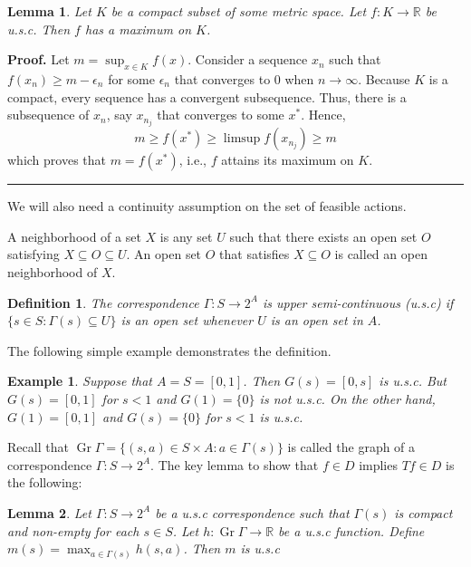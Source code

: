 \documentclass[letter,11pt]{article}
\newtheorem{definition}{Definition}[section]
\newtheorem{example}{Example}[section]
\newtheorem{lemma}{Lemma}[section]
\newenvironment {proof}[1][Proof]{\noindent \textbf {#1.} }{\ \rule {0.5em}{0.5em}}
\begin{document}
\begin{lemma} \label{Lemma:USC_MAX}
     Let $K$ be a compact subset of some metric space. Let $f:K \rightarrow \mathbb{R}$ be u.s.c. 
     Then $f$ has a maximum on $K$. 
\end{lemma}
\begin{proof}
     Let $m = \sup _{x \in K} f(x)$. Consider a sequence $x_{n}$ such that $f(x_{n}) \geq m - \epsilon_{n}$ for some $\epsilon_{n} $ that converges to $0$ when $n \rightarrow \infty$. Because $K$ is a compact, every sequence has a convergent subsequence. Thus, there is a subsequence of $x_{n}$, say $x_{n_{j}}$ that converges to some $x^{*}$. Hence, 
$$ m \geq f(x^{*}) \geq \limsup f(x_{n_{j}}) \geq m $$
which proves that $m = f(x^{*})$, i.e., $f$ attains its maximum on $K$. 
\end{proof}

We will also need a continuity assumption on the set of feasible actions. 

A neighborhood of a set $X$ is any set $U$ such that there exists an open set $O$ satisfying $X \subseteq O \subseteq U$. An open set $O$ that satisfies $X \subseteq O$ is called an open neighborhood of $X$. 

\begin{definition}
    The correspondence $\Gamma:S \rightarrow 2^{A}$ is upper semi-continuous (u.s.c) if $\{s \in S: \Gamma(s) \subseteq U \}$ is an open set whenever $U$ is an open set in $A$. 
\end{definition}

The following simple example demonstrates the definition. 

\begin{example}
     Suppose that $A=S=[0,1]$. Then $G(s) = [0,s]$ is u.s.c. But $G(s) = [0,1]$ for $s<1$ and $G(1) = \{0\}$ is not u.s.c.  
On the other hand, 
     $G(1) = [0,1]$ and $G(s) = \{0\}$ for $s<1$ is u.s.c.  
\end{example}


Recall that  $\operatorname{Gr} \Gamma = \{ (s,a) \in S \times A : a \in \Gamma(s) \}$ is called the graph of  a correspondence $\Gamma:S \rightarrow 2^{A}$. 
The key lemma to show that $f \in D$ implies $Tf \in D$ is the following:

\begin{lemma} \label{Lemma:max}
    Let $\Gamma:S \rightarrow 2^{A}$ be a u.s.c correspondence such that $\Gamma(s)$ is compact and non-empty for each $s \in S$.  Let $h: \operatorname{Gr} \Gamma \rightarrow \mathbb {R}$ be a u.s.c function. Define $ m(s) = \max _{a \in \Gamma(s)} h(s,a) $. Then $m$ is u.s.c 
\end{lemma}
\end{document}
